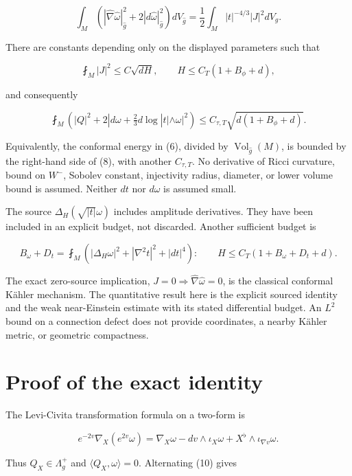 \documentclass[
]{article}
\begin{document}
\[
 \boxed{\int_M\left(|\widehat\nabla\widehat\omega|_{\widehat g}^2
                   +2|d\widehat\omega|_{\widehat g}^2\right)dV_{\widehat g}
       =\frac12\int_M|t|^{-4/3}|J|^2dV_g.}
 \tag{6}
\]

There are constants depending only on the displayed parameters such that

\[
 \fint_M|J|^2\le C\sqrt{dH},\qquad
 H\le C_T(1+B_\phi+d),
 \tag{7}
\]

and consequently

\[
 \boxed{\fint_M\left(|Q|^2
      +2|d\omega+\tfrac23d\log|t|\wedge\omega|^2\right)
 \le C_{\tau,T}\sqrt{d(1+B_\phi+d)}.}
 \tag{8}
\]

Equivalently, the conformal energy in (6), divided by
\(\operatorname{Vol}_{\widehat g}(M)\), is bounded by the right-hand
side of (8), with another \(C_{\tau,T}\). No derivative of Ricci
curvature, bound on \(W^-\), Sobolev constant, injectivity radius,
diameter, or lower volume bound is assumed. Neither \(dt\) nor
\(d\omega\) is assumed small.

The source \(\Delta_H(\sqrt{|t|}\omega)\) includes amplitude
derivatives. They have been included in an explicit budget, not
discarded. Another sufficient budget is

\[
 B_\omega+D_t=\fint_M\left(|\Delta_H\omega|^2
                        +|\nabla^2t|^2+|dt|^4\right):
 \qquad H\le C_T(1+B_\omega+D_t+d).
 \tag{9}
\]

The exact zero-source implication,
\(J=0\Rightarrow \widehat\nabla\widehat\omega=0\), is the classical
conformal Kähler mechanism. The quantitative result here is the explicit
sourced identity and the weak near-Einstein estimate with its stated
differential budget. An \(L^2\) bound on a connection defect does not
provide coordinates, a nearby Kähler metric, or geometric compactness.

\hypertarget{proof-of-the-exact-identity}{%
\section{Proof of the exact
identity}\label{proof-of-the-exact-identity}}

The Levi-Civita transformation formula on a two-form is

\[
 e^{-2v}\widehat\nabla_X(e^{2v}\omega)
 =\nabla_X\omega-dv\wedge\iota_X\omega
                         +X^\flat\wedge\iota_{\nabla v}\omega.
 \tag{10}
\]

Thus \(Q_X\in\Lambda_g^+\) and \(\langle Q_X,\omega\rangle=0\).
Alternating (10) gives
\end{document}
